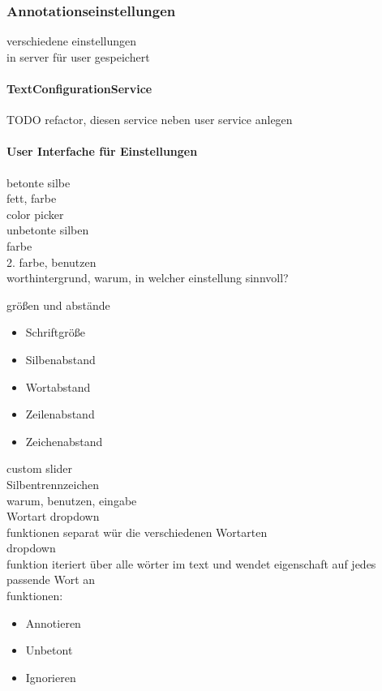 \subsubsection{Annotationseinstellungen}

verschiedene einstellungen\\
in server für user gespeichert\\

\paragraph{TextConfigurationService}

TODO refactor, diesen service neben user service anlegen

\paragraph{User Interfache für Einstellungen}
betonte silbe\\
fett, farbe\\

color picker\\

unbetonte silben\\
farbe\\
2. farbe, benutzen\\

worthintergrund, warum, in welcher einstellung sinnvoll?

größen und abstände\\
\begin{itemize}
	\item Schriftgröße
	\item Silbenabstand
	\item Wortabstand
	\item Zeilenabstand
	\item Zeichenabstand
\end{itemize}

custom slider\\

Silbentrennzeichen\\
warum, benutzen, eingabe\\

Wortart dropdown\\
funktionen separat wür die verschiedenen Wortarten\\
dropdown\\
funktion iteriert über alle wörter im text und wendet eigenschaft auf jedes passende Wort an\\
funktionen:\\
\begin{itemize}
	\item Annotieren
	\item Unbetont
	\item Ignorieren
\end{itemize}

